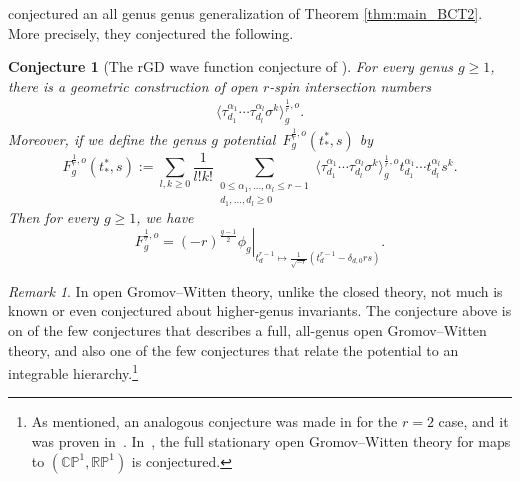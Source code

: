 \documentclass[11pt]{amsart}
\newtheorem{conj}{Conjecture}
\theoremstyle{definition}
\theoremstyle{remark}
\newtheorem{rmk}[dummy]{Remark}
\renewcommand{\d}{\ensuremath{\partial}}
\newcommand{\<}{\left<}
\renewcommand{\>}{\right>}
\numberwithin{equation}{section}
\begin{document}
\cite{BCT3} conjectured an  all genus genus generalization of Theorem \ref{thm:main_BCT2}. More precisely, they conjectured the following. 
\begin{conj}[The rGD wave function conjecture of \cite{BCT3}]\label{conj:main_conj_BCT}
For every genus $g\geq 1$, there is a geometric construction of open $r$-spin intersection numbers
\begin{gather}\label{eq:open_numbers_all_g}
\langle\tau^{\alpha_1}_{d_1}\cdots\tau^{\alpha_l}_{d_l}\sigma^k\rangle^{\frac{1}{r},o}_g.
\end{gather}
Moreover, if we define the genus $g$ potential~$F_g^{\frac{1}{r},o}(t^*_*,s)$ %
by
\begin{equation}\label{eq:g_pot}
F_g^{\frac{1}{r},o}(t^*_*,s):=\sum_{l,k\ge 0}\frac{1}{l!k!}\sum_{\substack{0\le\alpha_1,\ldots,\alpha_l\le r-1\\d_1,\ldots,d_l\ge 0}}\langle\tau^{\alpha_1}_{d_1}\cdots\tau^{\alpha_l}_{d_l}\sigma^k\rangle^{\frac{1}{r},o}_g t^{\alpha_1}_{d_1}\cdots t^{\alpha_l}_{d_l}s^k.
\end{equation}
Then for %
every $g\geq 1$, we have
\begin{equation}\label{eq:bct_conj}
F^{\frac{1}{r},o}_g=\left.(-r)^{\frac{g-1}{2}}\phi_g\right|_{t^{r-1}_d\mapsto\frac{1}{\sqrt{-r}}(t^{r-1}_d-\delta_{d,0}rs)}.
\end{equation}
\end{conj}
\begin{rmk}
In open Gromov--Witten theory, unlike the closed theory, not much is known or even conjectured about higher-genus invariants. The conjecture above is on of the few conjectures that describes a full, all-genus open Gromov--Witten theory, and also one of the few conjectures that relate the potential to an integrable hierarchy.\footnote{%
As mentioned, an %
analogous conjecture was made in \cite{PST14} for the $r=2$ case, and it was proven in~\cite{BT17}. In~\cite{BPTZ}, the full stationary open Gromov--Witten theory for maps to $(\mathbb{CP}^1,\mathbb{RP}^1)$ is conjectured.}
\end{rmk}
\end{document}
